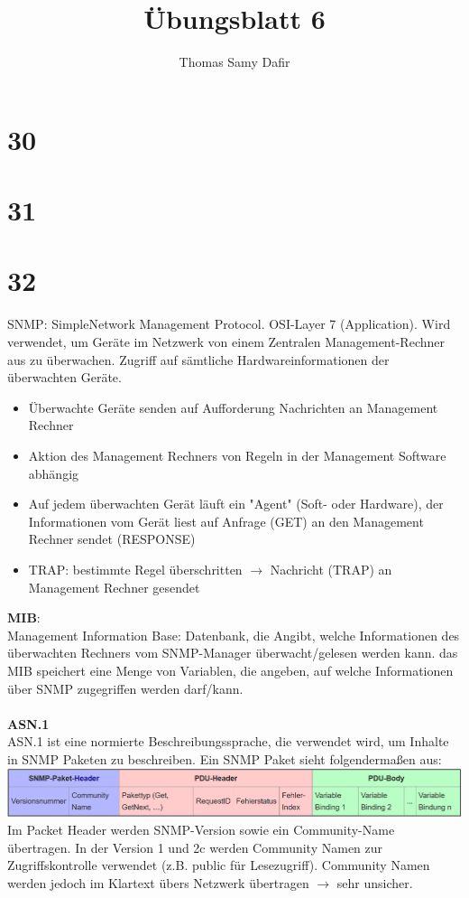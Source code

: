 \documentclass[12pt, a4paper]{article}
\title{Übungsblatt 6}
\author{Thomas Samy Dafir}
\date{}
\begin{document}
	
\section*{30}

\section*{31}

\section*{32}
	SNMP: SimpleNetwork Management Protocol. OSI-Layer 7 (Application).
	Wird verwendet, um Geräte im Netzwerk von einem Zentralen Management-Rechner aus zu überwachen.
	Zugriff auf sämtliche Hardwareinformationen der überwachten Geräte.
	\begin{itemize}
		\item Überwachte Geräte senden auf Aufforderung Nachrichten an Management Rechner
		\item Aktion des Management Rechners von Regeln in der Management Software abhängig
		\item Auf jedem überwachten Gerät läuft ein "Agent" (Soft- oder Hardware), der Informationen vom Gerät liest auf Anfrage (GET) an den Management Rechner sendet (RESPONSE)
		\item TRAP: bestimmte Regel überschritten $\rightarrow$ Nachricht (TRAP) an Management Rechner gesendet
	\end{itemize}
	\textbf{MIB}:\\
	Management Information Base: Datenbank, die Angibt, welche Informationen des überwachten Rechners vom SNMP-Manager überwacht/gelesen werden kann. das MIB speichert eine Menge von Variablen, die angeben, auf welche Informationen über SNMP zugegriffen werden darf/kann.
	\\
	\\
	\textbf{ASN.1}\\
	ASN.1 ist eine normierte Beschreibungssprache, die verwendet wird, um Inhalte in SNMP Paketen zu beschreiben. Ein SNMP Paket sieht folgendermaßen aus:\\
	\includegraphics[width = \textwidth]{snmp_header.png}
	\\
	Im Packet Header werden SNMP-Version sowie ein Community-Name übertragen. In der Version 1 und 2c werden Community Namen zur Zugriffskontrolle verwendet (z.B. public für Lesezugriff). Community Namen werden jedoch im Klartext übers Netzwerk übertragen $\rightarrow$ sehr unsicher.\\
\end{document}
